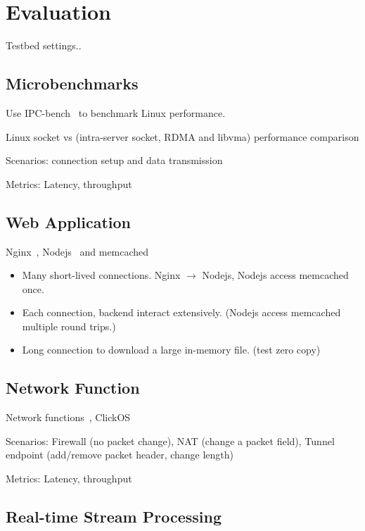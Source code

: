 \section{Evaluation}
\label{sec:evaluation}

Testbed settings..

\subsection{Microbenchmarks}

Use IPC-bench~\cite{ipc-bench} to benchmark Linux performance.

Linux socket vs \sys (intra-server socket, RDMA and libvma) performance comparison

Scenarios: connection setup and data transmission

Metrics: Latency, throughput

\subsection{Web Application}

Nginx~\cite{nginx}, Nodejs~\cite{nodejs} and memcached~\cite{memcached}

\begin{itemize}
	\item Many short-lived connections. Nginx $\rightarrow$ Nodejs, Nodejs access memcached once.
	\item Each connection, backend interact extensively. (Nodejs access memcached multiple round trips.)
	\item Long connection to download a large in-memory file. (test zero copy)
\end{itemize}

\subsection{Network Function}

Network functions~\cite{li2016clicknp}, ClickOS~\cite{martins2014clickos}

Scenarios: Firewall (no packet change), NAT (change a packet field), Tunnel endpoint (add/remove packet header, change length)

Metrics: Latency, throughput

\subsection{Real-time Stream Processing}

